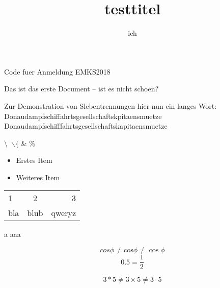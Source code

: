 \documentclass{scrartcl}
\title{testtitel}
\author{ich}
\begin{document}
\maketitle

Code fuer Anmeldung EMKS2018

Das ist das erste Document -- ist es nicht schoen?

Zur Demonstration von Slebentrennungen hier nun ein langes Wort: Donaudampfschiffahrtsgesellschaftskpitaensmuetze\newline
Donau\-dampf\-schiff\-fahrts\-gesell\-schafts\-kapitaens\-muetze\newline

\textbackslash \ $\backslash \{$ \& \%


\begin{itemize}
\item Erstes Item
\item Weiteres Item
\end{itemize}

\begin{tabular}{lc|r}
 1 & 2 & 3\\
 bla & blub & qweryz\\
 \hline
\end{tabular}
\newline \newline

a a\enspace a\quad a\qquad

\[cos \phi \neq \text{cos} \phi \neq \cos \phi\]
\newline
\[0.5 = \frac{1}{2}\]

\[3*5\neq 3\times 5 \neq 3\cdot5\]
\end{document}
